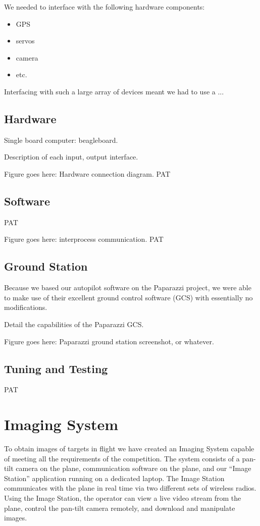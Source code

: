 \documentclass[10pt,twocolumns]{report}
\begin{document}
We needed to interface with the following hardware components:
\begin{itemize}
	\setlength{\itemsep}{0cm}
	\setlength{\parskip}{0cm}
	\item GPS
	\item servos
	\item camera
	\item etc.
\end{itemize}

Interfacing with such a large array of devices meant we had to use a ...

\subsection{Hardware}
Single board computer: beagleboard.

Description of each input, output interface.

Figure goes here: Hardware connection diagram. PAT
\subsection{Software}
\label{sec:autopilot_software}
PAT

Figure goes here: interprocess communication. PAT
\subsection{Ground Station}
Because we based our autopilot software on the Paparazzi project, we were able to make use of their excellent ground control software (GCS) with essentially no modifications.

Detail the capabilities of the Paparazzi GCS.

Figure goes here: Paparazzi ground station screenshot, or whatever. 
\subsection{Tuning and Testing}
PAT

\section{Imaging System}

To obtain images of targets in flight we have created an Imaging System capable of meeting all the requirements of the competition.  The system consists of a pan-tilt camera on the plane, communication software on the plane, and our ``Image Station'' application running on a dedicated laptop.  The Image Station communicates with the plane in real time via two different sets of wireless radios.  Using the Image Station, the operator can view a live video stream from the plane, control the pan-tilt camera remotely, and download and manipulate images.
\end{document}
